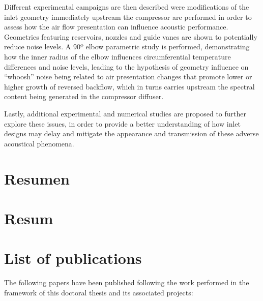 \documentclass[final,twoside,11pt]{book}
\numberwithin{equation}{section}
\numberwithin{figure}{chapter}
\numberwithin{table}{chapter}
\begin{document}
Different experimental campaigns are then described were modifications of the inlet geometry immediately upstream the compressor are performed in order to assess how the air flow presentation can influence acoustic performance. Geometries featuring reservoirs, nozzles and guide vanes are shown to potentially reduce noise levels. A 90º elbow parametric study is performed, demonstrating how the inner radius of the elbow influences circumferential temperature differences and noise levels, leading to the hypothesis of geometry influence on ``whoosh'' noise being related to air presentation changes that promote lower or higher growth of reversed backflow, which in turns carries upstream the spectral content being generated in the compressor diffuser. 

Lastly, additional experimental and numerical studies are proposed to further explore these issues, in order to provide a better understanding of how inlet designs may delay and mitigate the appearance and transmission of these adverse acoustical phenomena.

\cleardoublepage

\chapter*{Resumen}

\cleardoublepage

\chapter*{Resum}

\cleardoublepage

\chapter*{List of publications}

The following papers have been published following the work performed in the framework of this doctoral thesis and its associated projects:
\end{document}
